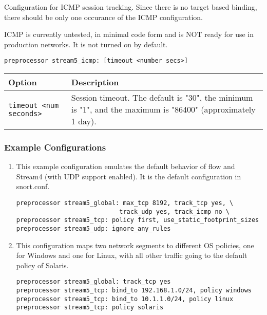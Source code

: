 \documentclass[english]{report}
\newenvironment{note}{
\samepage
    \vspace{10pt}{\textsf{
        {\hspace{7pt}\Huge{$\triangle$\hspace{-12.5pt}{\Large{$^!$}}}}\hspace{5pt}
        {\Large{NOTE}}
    }
    }
   \begin{center}
    \par\vspace{-17pt}

    \begin{lrbox}{\savepar}
    \begin{minipage}[r]{6in}
}
{
    \end{minipage}
    \end{lrbox}
    \fbox{
        \usebox{
            \savepar
	}
    }
    \par\vskip10pt
    \end{center}
}
\begin{document}
Configuration for ICMP session tracking.  Since there is no target based
binding, there should be only one occurance of the ICMP configuration.

\begin{note}
ICMP is currently untested, in minimal code form and is NOT ready
for use in production networks.  It is not turned on by default.
\end{note}

\begin{verbatim}
preprocessor stream5_icmp: [timeout <number secs>]
\end{verbatim}

\begin{tabular}{| l | p{3.5in} |}
\hline
\textbf{Option} & \textbf{Description}\\
\hline 
\hline 
\texttt{timeout <num seconds>} & Session timeout.  The default is "30", the minimum is "1", and the maximum is "86400" (approximately 1 day).\\
\hline
\end{tabular}

\subsubsection{Example Configurations}

\begin{enumerate}
\item{}
This example configuration emulates the default behavior of flow and
Stream4 (with UDP support enabled).  It is the default configuration in
snort.conf.

\begin{verbatim}
preprocessor stream5_global: max_tcp 8192, track_tcp yes, \
                            track_udp yes, track_icmp no \
preprocessor stream5_tcp: policy first, use_static_footprint_sizes
preprocessor stream5_udp: ignore_any_rules
\end{verbatim}

\item{}
This configuration maps two network segments to different OS policies, one
for Windows and one for Linux, with all other traffic going to the default
policy of Solaris.

\begin{verbatim}
preprocessor stream5_global: track_tcp yes
preprocessor stream5_tcp: bind_to 192.168.1.0/24, policy windows
preprocessor stream5_tcp: bind_to 10.1.1.0/24, policy linux
preprocessor stream5_tcp: policy solaris
\end{verbatim}

\end{enumerate}
\end{document}
